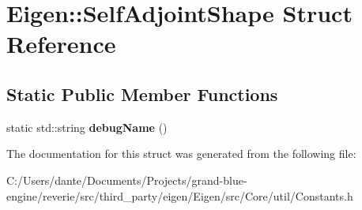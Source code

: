 \hypertarget{struct_eigen_1_1_self_adjoint_shape}{}\section{Eigen\+::Self\+Adjoint\+Shape Struct Reference}
\label{struct_eigen_1_1_self_adjoint_shape}
\subsection*{Static Public Member Functions}
\begin{DoxyCompactItemize}
\item 
\mbox{\label{struct_eigen_1_1_self_adjoint_shape_a52c0289f8b1a896123ac4da6a889963e}} 
static std\+::string {\bfseries debug\+Name} ()
\end{DoxyCompactItemize}


The documentation for this struct was generated from the following file\+:\begin{DoxyCompactItemize}
\item 
C\+:/\+Users/dante/\+Documents/\+Projects/grand-\/blue-\/engine/reverie/src/third\+\_\+party/eigen/\+Eigen/src/\+Core/util/Constants.\+h\end{DoxyCompactItemize}
